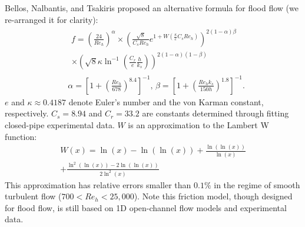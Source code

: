 Bellos, Nalbantis, and Tsakiris proposed an alternative formula for flood flow (we re-arranged it for clarity):
\begin{equation}
    \begin{split}
        &\begin{multlined}
            f =
            \left( \frac{24}{Re_h} \right)^\alpha
            \times
            \left( \frac{\sqrt{8}}{C_sRe_h}e^{1+W(\frac{\kappa}{e}C_sRe_h)} \right)^{2\left(1-\alpha\right)\beta}
            \\
            \times
            \left( \sqrt{8}\kappa\ln^{-1}(\frac{C_r}{e}\frac{h}{k_s}) \right)^{2\left(1-\alpha\right)\left(1-\beta\right)}
        \end{multlined} \\
        &\alpha=\left[1+\left(\frac{Re_h}{678}\right)^{8.4}\right]^{-1}
        \text{, }
        \beta=\left[1+\left(\frac{Re_h k_s}{150h}\right)^{1.8}\right]^{-1}.
    \end{split}
\end{equation}
$e$ and $\kappa\approx 0.4187$ denote Euler's number and the von Karman constant, respectively.
$C_s=8.94$ and $C_r=33.2$ are constants determined through fitting closed-pipe experimental data.
$W$ is an approximation to the Lambert W function: 
\begin{equation}
    \begin{multlined}
        W(x)
        =
        \ln(x)
        -
        \ln(\ln(x))
        +
        \frac{\ln(\ln(x))}{\ln(x)}
        \\
        +
        \frac{\ln^2(\ln(x))-2\ln(\ln(x))}{2\ln^2(x)}
    \end{multlined}
\end{equation}
This approximation has relative errors smaller than $0.1\%$ in the regime of smooth turbulent flow ($700 < Re_h < 25{,}000$).
Note this friction model, though designed for flood flow, is still based on 1D open-channel flow models and experimental data.

